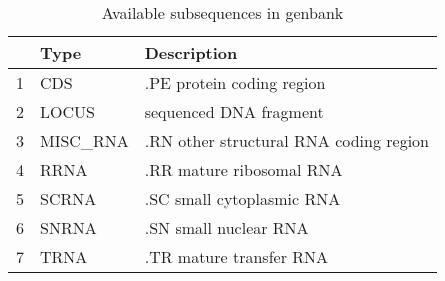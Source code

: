 \begin{table}[ht]
\begin{center}
\begin{tabular}{rll}
\hline
 & Type & Description \\
\hline
1 &      CDS &              .PE protein coding region \\
2 &    LOCUS &                 sequenced DNA fragment \\
3 & MISC\_RNA & .RN other structural RNA coding region \\
4 &     RRNA &               .RR mature ribosomal RNA \\
5 &    SCRNA &              .SC small cytoplasmic RNA \\
6 &    SNRNA &                  .SN small nuclear RNA \\
7 &     TRNA &                .TR mature transfer RNA \\
\hline
\end{tabular}
\caption{Available subsequences in genbank}
\label{genbank}
\end{center}
\end{table}
